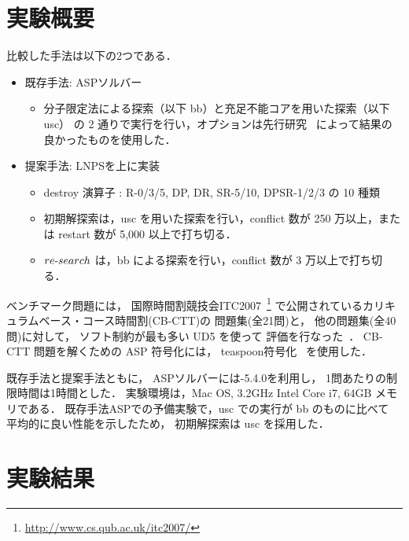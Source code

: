 \section{実験概要}
比較した手法は以下の2つである．
\begin{itemize}\compress
\item 既存手法: ASPソルバー{\clingo}
 \begin{itemize}
  \item 分子限定法による探索（以下 bb）と充足不能コアを用いた探索（以下 usc）
  の 2 通りで実行を行い，オプションは先行研究~\cite{anor/Banbara2019}
  によって結果の良かったものを使用した．
 \end{itemize}
\item 提案手法: LNPSを{\clingo}上に実装
 \begin{itemize}
  \item destroy 演算子 : R-0/3/5, DP, DR, SR-5/10, DPSR-1/2/3 の 10 種類
  \item 初期解探索は，usc を用いた探索を行い，conflict 数が 250 万以上，または restart 数が 5,000 以上で打ち切る．
  \item $re\mathchar`-search$ は，bb による探索を行い，conflict 数が 3 万以上で打ち切る．
  
 \end{itemize}
\end{itemize}

ベンチマーク問題には，
国際時間割競技会ITC2007~\footnote{%
  \url{http://www.cs.qub.ac.uk/itc2007/}}
で公開されているカリキュラムベース・コース時間割(CB-CTT)の
問題集(全21問)と，
他の問題集(全40問)に対して，
ソフト制約が最も多い UD5 を使って
評価を行なった~\cite{GasperoMS/ITC2007,DBLP:journals/anor/BonuttiCGS12}．
CB-CTT 問題を解くための ASP 符号化には，
\textsf{teaspoon}符号化~\cite{anor/Banbara2019}
を使用した．
%

既存手法と提案手法ともに，
ASPソルバーには{\clingo}-5.4.0を利用し，
1問あたりの制限時間は1時間とした．
実験環境は，Mac OS, 3.2GHz Intel Core i7, 64GB メモリである．
既存手法ASPでの予備実験で，usc での実行が bb のものに比べて
平均的に良い性能を示したため，
初期解探索は usc を採用した．

\section{実験結果}

